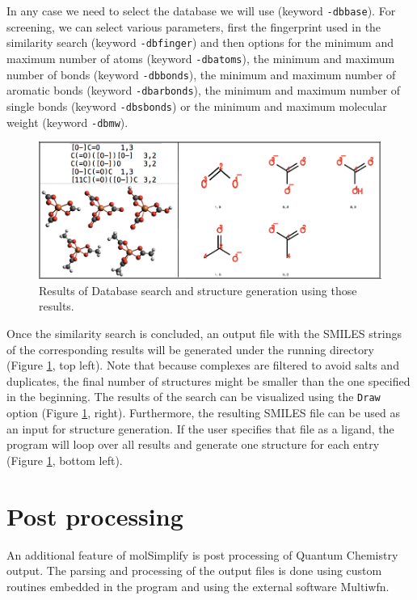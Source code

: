 \documentclass[a4paper,12pt]{assignment}
\begin{document}
 In any case we need to select the database we will use (keyword \texttt{-dbbase}). For screening, we can select various parameters, first the fingerprint used in the similarity search (keyword \texttt{-dbfinger}) and then options for the minimum and maximum number of atoms (keyword \texttt{-dbatoms}), the minimum and maximum number of bonds (keyword \texttt{-dbbonds}), the minimum and maximum number of aromatic bonds (keyword \texttt{-dbarbonds}), the minimum and maximum number of single bonds (keyword \texttt{-dbsbonds}) or the minimum and maximum molecular weight (keyword \texttt{-dbmw}).

\begin{figure}[htb!]
\centering
\includegraphics[width=\textwidth]{./Figures/fig14b.png}
\caption{Results of Database search and structure generation using those results.}
\label{db2}
\end{figure}

Once the similarity search is concluded, an output file with the SMILES strings of the corresponding results will be generated under the running directory (Figure \ref{db2}, top left). Note that because complexes are filtered to avoid salts and duplicates, the final number of structures might be smaller than the one specified in the beginning. The results of the search can be visualized using the \texttt{Draw} option (Figure \ref{db2}, right). Furthermore, the resulting SMILES file can be used as an input for structure generation. If the user specifies that file as a ligand, the program will loop over all results and generate one structure for each entry (Figure \ref{db2}, bottom left).


\section{Post processing}

An additional feature of molSimplify is post processing of Quantum Chemistry output. The parsing and processing of the output files is done using custom routines embedded in the program and using the external software Multiwfn. 
\end{document}
